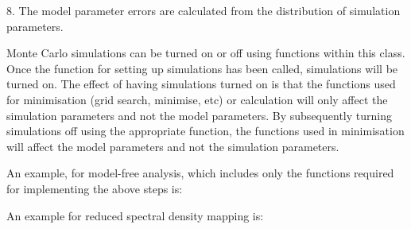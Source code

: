 8.  The model parameter errors are calculated from the distribution of simulation parameters.


Monte Carlo simulations can be turned on or off using functions within this class.  Once the function for setting up simulations has been called, simulations will be turned on.  The effect of having simulations turned on is that the functions used for minimisation (grid search, minimise, etc) or calculation will only affect the simulation parameters and not the model parameters.  By subsequently turning simulations off using the appropriate function, the functions used in minimisation will affect the model parameters and not the simulation parameters.


An example, for model-free analysis, which includes only the functions required for implementing the above steps is:










An example for reduced spectral density mapping is:









